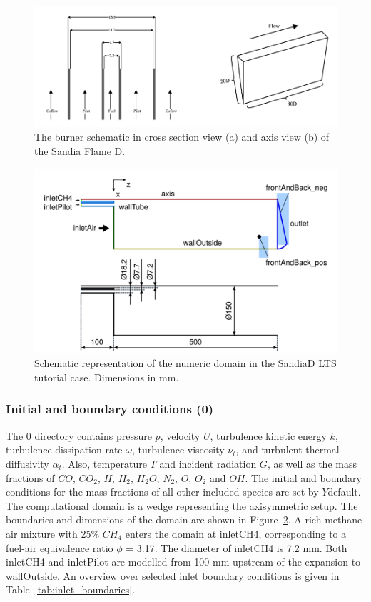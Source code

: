 \begin{figure}[H]
    \centering
    \includegraphics[width=0.95\linewidth]{figs/SandiaD/Screenshot from 2025-03-12 07-11-47.png}
    \caption{The burner schematic in cross section view (a) and axis view (b) of the Sandia Flame D.}
    \label{fig:domain}
\end{figure}

\begin{figure}[H]
    \centering
    \includegraphics[width=0.95\linewidth]{figs/SandiaD/Screenshot from 2025-03-12 06-58-20.png}
    \caption{Schematic representation of the numeric domain in the SandiaD LTS tutorial case. Dimensions in mm.}
    \label{fig:domain2}
\end{figure}

\subsubsection*{Initial and boundary conditions (0)}
The 0 directory contains pressure $p$, velocity $U$, turbulence kinetic energy $k$, turbulence dissipation rate $\omega$, turbulence viscosity $\nu_t$, and turbulent thermal diffusivity $\alpha_t$. Also, temperature $T$ and incident radiation $G$, as well as the mass fractions of $CO$, $CO_2$, $H$, $H_2$, $H_2O$, $N_2$, $O$, $O_2$ and $OH$. The initial and boundary conditions for the mass fractions of all other included species are set by $Y$default. The computational domain is a wedge representing the axisymmetric setup. The boundaries and dimensions of the domain are shown in Figure~\ref{fig:domain2}. A rich methane-air mixture with 25\% $CH_4$ enters the domain at inletCH4, corresponding to a fuel-air equivalence ratio $\phi$ = 3.17. The diameter of inletCH4 is 7.2 mm. Both inletCH4 and inletPilot are modelled from 100 mm upstream of the expansion to wallOutside. An overview over selected inlet boundary conditions is given in Table~\ref{tab:inlet_boundaries}.

